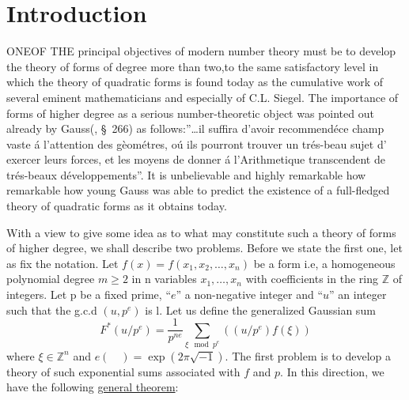 \chapter*{Introduction}


ONE\pageoriginale OF THE principal objectives of modern number theory must be to
develop the theory of forms of degree more than two,to the same
satisfactory level in which the theory of quadratic forms is found
today as the cumulative work of several eminent mathematicians and
especially of C.L. Siegel. The importance of forms of higher degree as
a serious number-theoretic object was pointed out already by
Gauss(\cite{Gau}, \S\ 266) as follows:''\ldots il suffira d'avoir
recommend\'ece champ vaste \'a l'attention des g\`eom\'etres,
o\'u ils pourront trouver un tr\'es-beau sujet d' exercer leurs
forces, et les moyens de donner \'a l'Arithmetique transcendent de
tr\'es-beaux d\'eveloppements''. It is unbelievable and highly
remarkable how remarkable how young Gauss was able to predict the
existence of a full-fledged theory of quadratic forms as it obtains
today. 

With a view to give some idea as to what may constitute such a theory
of forms of higher degree, we shall describe two problems. Before we
state the first one, let as fix the notation. Let
$f(x)=f(x_{1},x_{2},\ldots,x_{n})$ be a form i.e, a homogeneous
polynomial degree $m\ge 2$ in n variables $x_{1},\ldots,x_{n}$ with
coefficients in the ring $\mathbb{Z}$ of integers. Let p be a fixed
prime, ``$e$'' a non-negative integer and ``$u$'' an integer such that the g.c.d
$(u,p^e)$ is l. Let us define the generalized Gaussian sum
\begin{equation*}
  F^\ast(u/p^e) = \frac{1}{p^{ne}}\sum_{\xi \mod p^e}((u/p^e)f(\xi))
\end{equation*}
where $\xi\in\mathbb{Z}^n$ and $e(\quad)=\exp(2\pi\sqrt{-1})$. The
first problem is to develop a theory of such exponential sums
associated with $f$ and $p$. In this direction, we have the following
\underline{general theorem}:

